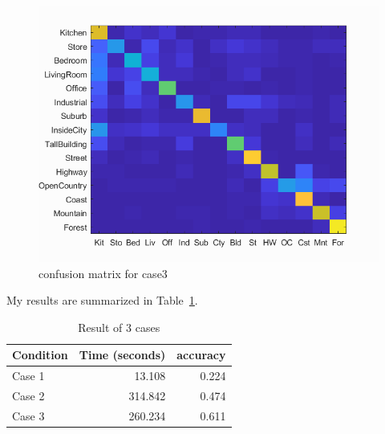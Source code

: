 \begin{figure}[h]
    \centering
    \includegraphics[width=13cm]{writeup/confusion_matrix3.png}
    \caption{confusion matrix for case3}
    \label{fig:result3}
\end{figure}

My results are summarized in Table~\ref{tab:table1}.

\begin{table}[h]
    \centering
    \begin{tabular}{lrr}
        \toprule
        Condition & Time (seconds) & accuracy\\
        \midrule
        Case 1 & 13.108 & 0.224\\
        Case 2 & 314.842 & 0.474\\
        Case 3 & 260.234 & 0.611\\
        \bottomrule
    \end{tabular}
    \caption{Result of 3 cases}
    \label{tab:table1}
\end{table}


